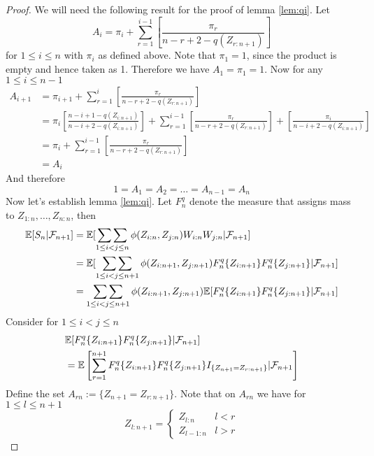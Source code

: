 \begin{proof}
We will need the following result for the proof of lemma \ref{lem:qi}. Let 
$$A_i = \pi_i + \sum\limits_{r=1}^{i-1}\left[\frac{\pi_r}{n-r+2-q(Z_{r:n+1})} \right]$$
for $1\leq i\leq n$ with $\pi_i$ as defined above. Note that $\pi_1 = 1$, since the product is empty and hence taken as 1. Therefore we have $A_1=\pi_1=1$. Now for any $1\leq i\leq n-1$ 
\begin{align*}
	A_{i+1} &= \pi_{i+1} + \sum\limits_{r=1}^i\left[\frac{\pi_r}{n-r+2-q(Z_{r:n+1})} \right]\\
	&= \pi_i \left[ \frac{n-i+1-q(Z_{i:n+1})}{n-i+2-q(Z_{i:n+1})}\right] + \sum\limits_{r=1}^{i-1}\left[\frac{\pi_r}{n-r+2-q(Z_{r:n+1})}\right] + \left[\frac{\pi_i}{n-i+2-q(Z_{i:n+1})}  \right]\\
	&= \pi_i + \sum\limits_{r=1}^{i-1}\left[\frac{\pi_r}{n-r+2-q(Z_{r:n+1})}\right]\\
	&= A_i
\end{align*}
And therefore 
\begin{equation}
1=A_1=A_2=\dots=A_{n-1}=A_n
\label{eq:Ai}
\end{equation}
%
Now let's establish lemma \ref{lem:qi}. Let $F_n^q$ denote the measure that assigns mass to $Z_{1:n},\dots,Z_{n:n}$, then
\begin{align*}
\mathbb{E}[S_{n}|\mathcal{F}_{n+1}] &= \mathbb{E}[\mathop{\sum\sum}\limits_{1\leq i<j\leq n} \phi(Z_{i:n},Z_{j:n}) W_{i:n}W_{j:n}|\mathcal{F}_{n+1}]\\
    &= \mathbb{E}[\mathop{\sum\sum}\limits_{1\leq i<j\leq n+1} \phi(Z_{i:n+1},Z_{j:n+1}) F_n^q\{Z_{i:n+1}\}F_n^q\{Z_{j:n+1}\}|\mathcal{F}_{n+1}]\\
		&= \mathop{\sum\sum}\limits_{1\leq i<j\leq n+1} \phi(Z_{i:n+1},Z_{j:n+1}) \mathbb{E}[F_n^q\{Z_{i:n+1}\}F_n^q\{Z_{j:n+1}\}|\mathcal{F}_{n+1}]
\end{align*}
%
Consider for $1\leq i<j\leq n$ 
\begin{align*}
& \mathbb{E}[F_n^q\{Z_{i:n+1}\}F_n^q\{Z_{j:n+1}\}|\mathcal{F}_{n+1}] \\
&=\mathbb{E}\left[\sum\limits_{r=1}^{n+1}F_n^q\{Z_{i:n+1}\}F_n^q\{Z_{j:n+1}\}I_{\{Z_{n+1}=Z_{r:n+1}\}}|\mathcal{F}_{n+1}\right]
\end{align*}
%
Define the set $A_{rn} := \{Z_{n+1}=Z_{r:n+1}\}$. Note that on $A_{rn}$ we have for $1\leq l\leq n+1$
\begin{equation}
Z_{l:n+1} = \begin{cases} 
Z_{l:n} & l<r \\
Z_{l-1:n} & l>r
\end{cases}
\label{eq:change_order_delta}

\end{equation}
\end{proof}
